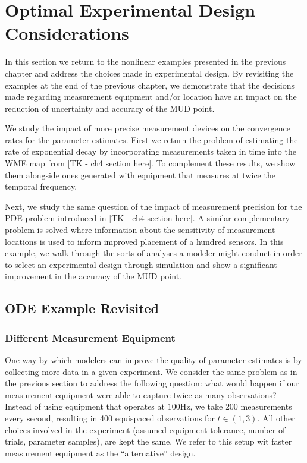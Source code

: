 \section{Optimal Experimental Design Considerations}

In this section we return to the nonlinear examples presented in the previous chapter and address the choices made in experimental design.
By revisiting the examples at the end of the previous chapter, we demonstrate that the decisions made regarding measurement equipment and/or location have an impact on the reduction of uncertainty and accuracy of the MUD point.

We study the impact of more precise measurement devices on the convergence rates for the parameter estimates.
First we return the problem of estimating the rate of exponential decay by incorporating measurements taken in time into the WME map from [TK - ch4 section here].
To complement these results, we show them alongside ones generated with equipment that measures at twice the temporal frequency.

Next, we study the same question of the impact of measurement precision for the PDE problem introduced in [TK - ch4 section here].
A similar complementary problem is solved where information about the sensitivity of measurement locations is used to inform improved placement of a hundred sensors.
In this example, we walk through the sorts of analyses a modeler might conduct in order to select an experimental design through simulation and show a significant improvement in the accuracy of the MUD point.


\subsection{ODE Example Revisited}

\FloatBarrier
\subsubsection{Different Measurement Equipment}

One way by which modelers can improve the quality of parameter estimates is by collecting more data in a given experiment.
We consider the same problem as in the previous section to address the following question: what would happen if our measurement equipment were able to capture twice as many observations?
Instead of using equipment that operates at $100$Hz, we take $200$ measurements every second, resulting in 400 equispaced observations for $t \in (1,3)$.
All other choices involved in the experiment (assumed equipment tolerance, number of trials, parameter samples), are kept the same.
We refer to this setup wit faster measurement equipment as the ``alternative'' design.


